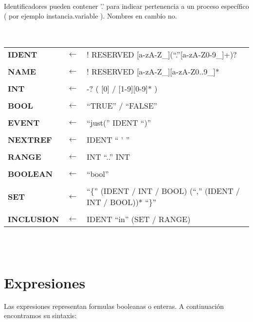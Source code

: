 \documentclass[titlepage, 12pt]{book}
\begin{document}
Identificadores pueden contener '.' para indicar pertenencia a un proceso específico ( por ejemplo instancia.variable ). Nombres en cambio no.\\

~\\\\
\begin{tabularx}{\textwidth}{>{\bfseries}llX}
IDENT & $\longleftarrow$ & ! RESERVED [a-zA-Z\_](``.''[a-zA-Z0-9\_]+)?\\\\
NAME & $\longleftarrow$ & ! RESERVED [a-zA-Z\_][a-zA-Z0..9\_]*\\\\
INT & $\longleftarrow$ & -? ( [0] / [1-9][0-9]* )\\\\
BOOL & $\longleftarrow$ & ``TRUE'' / ``FALSE''\\\\
EVENT & $\longleftarrow$ & ``just('' IDENT ``)''\\\\
NEXTREF & $\longleftarrow$ & IDENT `` ' ''\\\\
RANGE & $\longleftarrow$ & INT ``..'' INT\\\\
BOOLEAN & $\longleftarrow$ & ``bool''\\\\
SET & $\longleftarrow$ & ``\{'' (IDENT / INT / BOOL) (``,'' (IDENT / INT / BOOL))* ``\}''\\\\
INCLUSION & $\longleftarrow$ & IDENT ``in'' (SET / RANGE)\\
\end{tabularx}
~\\\\

\section{Expresiones}
Las expresiones representan formulas booleanas o enteras. A continuación encontramos su sintaxis:
\end{document}
